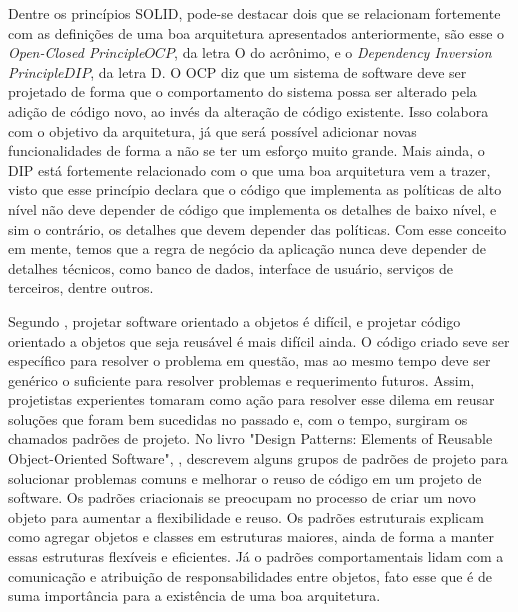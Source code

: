\documentclass[12pt, %
openright, 
oneside, %
a4paper,    %
brazil]{facom-ufu-abntex2}
\begin{document}
Dentre os princípios SOLID, pode-se destacar dois que se relacionam fortemente com as definições de uma boa arquitetura apresentados anteriormente, são esse o \textit{Open-Closed Principle\(OCP\)}, da letra O do acrônimo, e o \textit{Dependency Inversion Principle\(DIP\)}, da letra D. O OCP diz que um sistema de software deve ser projetado de forma que o comportamento do sistema possa ser alterado pela adição de código novo, ao invés da alteração de código existente. Isso colabora com o objetivo da arquitetura, já que será possível adicionar novas funcionalidades de forma a não se ter um esforço muito grande. Mais ainda, o DIP está fortemente relacionado com o que uma boa arquitetura vem a trazer, visto que esse princípio declara que o código que implementa as políticas de alto nível não deve depender de código que implementa os detalhes de baixo nível, e sim o contrário, os detalhes que devem depender das políticas. Com esse conceito em mente, temos que a regra de negócio da aplicação nunca deve depender de detalhes técnicos, como banco de dados, interface de usuário, serviços de terceiros, dentre outros.

Segundo , projetar software orientado a objetos é difícil, e projetar código orientado a objetos que seja reusável é mais difícil ainda. O código criado seve ser específico para resolver o problema em questão, mas ao mesmo tempo deve ser genérico o suficiente para resolver problemas e requerimento futuros. Assim, projetistas experientes tomaram como ação para resolver esse dilema em reusar soluções que foram bem sucedidas no passado e, com o tempo, surgiram os chamados padrões de projeto. No livro "Design Patterns: Elements of Reusable Object-Oriented Software", , descrevem alguns grupos de padrões de projeto para solucionar problemas comuns e melhorar o reuso de código em um projeto de software. Os padrões criacionais se preocupam no processo de criar um novo objeto para aumentar a flexibilidade e reuso. Os padrões estruturais explicam como agregar objetos e classes em estruturas maiores, ainda de forma a manter essas estruturas flexíveis e eficientes. Já o padrões comportamentais lidam com a comunicação e atribuição de responsabilidades entre objetos, fato esse que é de suma importância para a existência de uma boa arquitetura.
\end{document}
